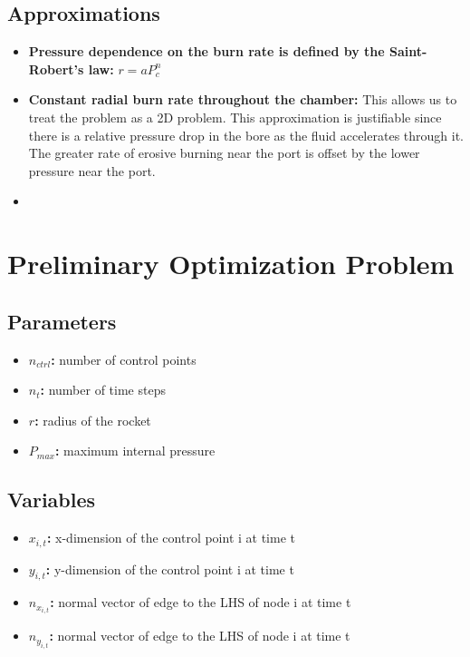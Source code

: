 \documentclass[12pt]{article}
\begin{document}
	\subsection{Approximations}
	\begin{itemize}
		\item \textbf{Pressure dependence on the burn rate is defined by the Saint-Robert's law:} $r = a P_c^n$
		\item \textbf{Constant radial burn rate throughout the chamber:} This allows us to treat the problem as a 2D problem. This approximation is justifiable since there is a relative pressure drop in the bore as the fluid accelerates through it. The greater rate of erosive burning near the port is offset by the lower pressure near the port. 
		\item 
	\end{itemize}
	
	
	\section{Preliminary Optimization Problem}
	
	\subsection{Parameters}
	\begin{itemize}
	\item \textbf{$n_{ctrl}$:} number of control points
	\item \textbf{$n_t$:} number of time steps
	\item \textbf{$r$:} radius of the rocket
	\item \textbf{$P_{max}$:} maximum internal pressure
	\end{itemize}
	
	\subsection{Variables}
	\begin{itemize}
		\item \textbf{$x_{i,t}$:} x-dimension of the control point i at time t
		\item \textbf{$y_{i,t}$:} y-dimension of the control point i at time t
		\item \textbf{$n_{x_{i,t}}$:} normal vector of edge to the LHS of node i at time t
		\item \textbf{$n_{y_{i,t}}$:} normal vector of edge to the LHS of node i at time t
	\end{itemize}
	
\end{document}
